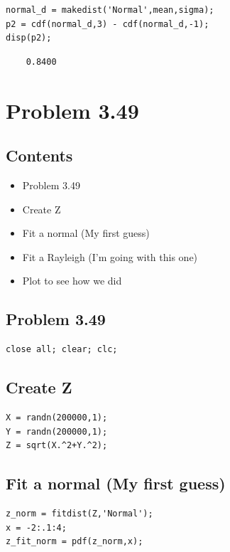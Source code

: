 \documentclass[12pt]{article}
\begin{document}
\begin{verbatim}
normal_d = makedist('Normal',mean,sigma);
p2 = cdf(normal_d,3) - cdf(normal_d,-1);
disp(p2);
\end{verbatim}

        \color{lightgray} \begin{verbatim}    0.8400

\end{verbatim} \color{black}

\newpage
\section*{Problem 3.49}

\subsection*{Contents}

\begin{itemize}
\setlength{\itemsep}{-1ex}
   \item Problem 3.49
   \item Create Z
   \item Fit a normal (My first guess)
   \item Fit a Rayleigh (I'm going with this one)
   \item Plot to see how we did
\end{itemize}

\subsection*{Problem 3.49}

\begin{verbatim}
close all; clear; clc;
\end{verbatim}

\subsection*{Create Z}

\begin{verbatim}
X = randn(200000,1);
Y = randn(200000,1);
Z = sqrt(X.^2+Y.^2);
\end{verbatim}

\subsection*{Fit a normal (My first guess)}

\begin{verbatim}
z_norm = fitdist(Z,'Normal');
x = -2:.1:4;
z_fit_norm = pdf(z_norm,x);
\end{verbatim}
\end{document}
